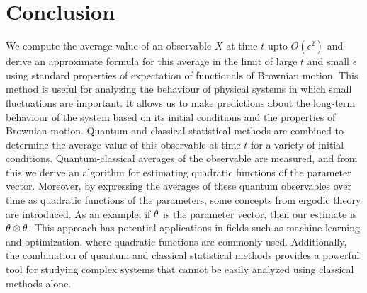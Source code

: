 \documentclass[journal,twocolumn]{IEEEtran}
\begin{document}
\section{Conclusion}

We compute the average value of an observable $X$ at time $t$ upto $O(\epsilon^2)$ and derive an approximate formula for this average in the limit of large $t$ and small $\epsilon$ using standard properties of expectation of functionals of Brownian motion. This method is useful for analyzing the behaviour of physical systems in which small fluctuations are important. It allows us to make predictions about the long-term behaviour of the system based on its initial conditions and the properties of Brownian motion. Quantum and classical statistical methods are combined to determine the average value of this observable at time $t$ for a variety of initial conditions. Quantum-classical averages of the observable are measured, and from this we derive an algorithm for estimating quadratic functions of the parameter vector. Moreover, by expressing the averages of these quantum observables over time as quadratic functions of the parameters, some concepts from ergodic theory are introduced. As an example, if ${\bf{\theta}}$ is the parameter vector, then our estimate is ${\bf{\theta}}\otimes {\bf{\theta}}$. This approach has potential applications in fields such as machine learning and optimization, where quadratic functions are commonly used. Additionally, the combination of quantum and classical statistical methods provides a powerful tool for studying complex systems that cannot be easily analyzed using classical methods alone.
\end{document}
